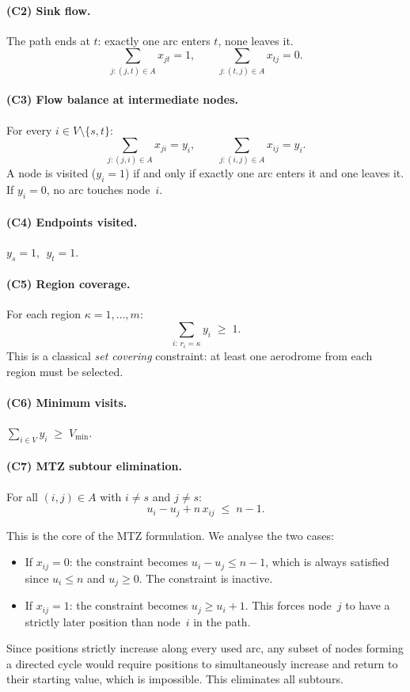 \documentclass[12pt, a4paper]{article}
\begin{document}
\paragraph{(C2) Sink flow.}
The path ends at $t$: exactly one arc enters $t$, none leaves it.
\[
  \sum_{j:(j,t)\in A} x_{jt} = 1, \qquad
  \sum_{j:(t,j)\in A} x_{tj} = 0.
\]

\paragraph{(C3) Flow balance at intermediate nodes.}
For every $i \in V \setminus \{s,t\}$:
\[
  \sum_{j:(j,i)\in A} x_{ji} = y_i, \qquad
  \sum_{j:(i,j)\in A} x_{ij} = y_i.
\]
A node is visited ($y_i = 1$) if and only if exactly one arc enters it and one
leaves it. If $y_i = 0$, no arc touches node~$i$.

\paragraph{(C4) Endpoints visited.}
$y_s = 1$, $\;y_t = 1$.

\paragraph{(C5) Region coverage.}
For each region $\kappa = 1,\ldots,m$:
\[
  \sum_{i:\,r_i = \kappa} y_i \;\geq\; 1.
\]
This is a classical \emph{set covering} constraint: at least one aerodrome from each
region must be selected.

\paragraph{(C6) Minimum visits.}
$\displaystyle\sum_{i \in V} y_i \;\geq\; V_{\min}.$

\paragraph{(C7) MTZ subtour elimination.}
For all $(i,j) \in A$ with $i \neq s$ and $j \neq s$:
\[
  u_i - u_j + n\,x_{ij} \;\leq\; n - 1.
\]

This is the core of the MTZ formulation. We analyse the two cases:
\begin{itemize}[nosep]
  \item If $x_{ij} = 0$: the constraint becomes $u_i - u_j \leq n-1$, which is
        always satisfied since $u_i \leq n$ and $u_j \geq 0$. The constraint is
        inactive.
  \item If $x_{ij} = 1$: the constraint becomes $u_j \geq u_i + 1$. This forces
        node~$j$ to have a strictly later position than node~$i$ in the path.
\end{itemize}
Since positions strictly increase along every used arc, any subset of nodes forming
a directed cycle would require positions to simultaneously increase and return to
their starting value, which is impossible. This eliminates all subtours.
\end{document}
